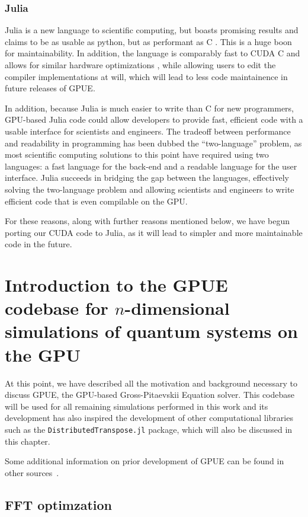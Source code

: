 \subsubsection{Julia}
Julia is a new language to scientific computing, but boasts promising results and claims to be as usable as python, but as performant as C .
This is a huge boon for maintainability.
In addition, the language is comparably fast to CUDA C and allows for similar hardware optimizations \cite{besard2016, besard2018}, while allowing users to edit the compiler implementations at will, which will lead to less code maintainence in future releases of GPUE.

In addition, because Julia is much easier to write than C for new programmers, GPU-based Julia code could allow developers to provide fast, efficient code with a usable interface for scientists and engineers.
The tradeoff between performance and readability in programming has been dubbed the ``two-language'' problem, as most scientific computing solutions to this point have required using two languages: a fast language for the back-end and a readable language for the user interface.
Julia succeeds in bridging the gap between the languages, effectively solving the two-language problem and allowing scientists and engineers to write efficient code that is even compilable on the GPU.

For these reasons, along with further reasons mentioned below, we have begun porting our CUDA code to Julia, as it will lead to simpler and more maintainable code in the future.

\section{Introduction to the GPUE codebase for $n$-dimensional simulations of quantum systems on the GPU}

At this point, we have described all the motivation and background necessary to discuss GPUE, the GPU-based Gross-Pitaevskii Equation solver.
This codebase will be used for all remaining simulations performed in this work and its development has also inspired the development of other computational libraries such as the \texttt{DistributedTranspose.jl} package, which will also be discussed in this chapter.

Some additional information on prior development of GPUE can be found in other sources~\cite{o2017}.

\subsection{FFT optimzation}

